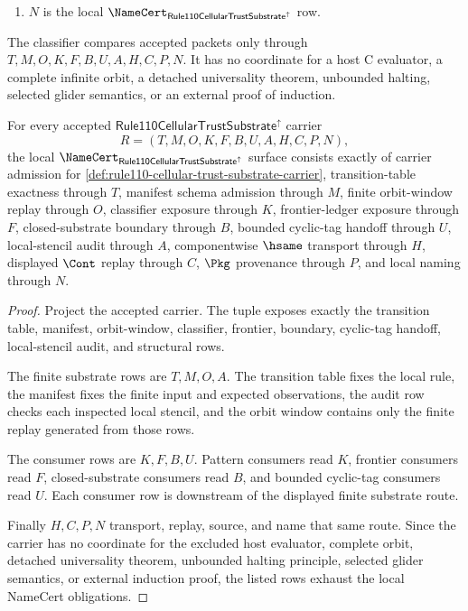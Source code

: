 \begin{definition}
\begin{enumerate}
\item $N$ is the local $\NameCert_{\mathsf{Rule110CellularTrustSubstrate}^{\uparrow}}$ row.
\end{enumerate}
The classifier compares accepted packets only through $T,M,O,K,F,B,U,A,H,C,P,N$. It has no coordinate for a host C evaluator, a complete infinite orbit, a detached universality theorem, unbounded halting, selected glider semantics, or an external proof of induction.
\end{definition}

\begin{theorem}
\label{thm:rule110-cellular-trust-substrate-namecert-obligations}
For every accepted $\mathsf{Rule110CellularTrustSubstrate}^{\uparrow}$ carrier
$$
R=(T,M,O,K,F,B,U,A,H,C,P,N),
$$
the local $\NameCert_{\mathsf{Rule110CellularTrustSubstrate}^{\uparrow}}$ surface consists exactly of carrier admission for \autoref{def:rule110-cellular-trust-substrate-carrier}, transition-table exactness through $T$, manifest schema admission through $M$, finite orbit-window replay through $O$, classifier exposure through $K$, frontier-ledger exposure through $F$, closed-substrate boundary through $B$, bounded cyclic-tag handoff through $U$, local-stencil audit through $A$, componentwise $\hsame$ transport through $H$, displayed $\Cont$ replay through $C$, $\Pkg$ provenance through $P$, and local naming through $N$.
\end{theorem}
\begin{proof}
Project the accepted carrier. The tuple exposes exactly the transition table, manifest, orbit-window, classifier, frontier, boundary, cyclic-tag handoff, local-stencil audit, and structural rows.

The finite substrate rows are $T,M,O,A$. The transition table fixes the local rule, the manifest fixes the finite input and expected observations, the audit row checks each inspected local stencil, and the orbit window contains only the finite replay generated from those rows.

The consumer rows are $K,F,B,U$. Pattern consumers read $K$, frontier consumers read $F$, closed-substrate consumers read $B$, and bounded cyclic-tag consumers read $U$. Each consumer row is downstream of the displayed finite substrate route.

Finally $H,C,P,N$ transport, replay, source, and name that same route. Since the carrier has no coordinate for the excluded host evaluator, complete orbit, detached universality theorem, unbounded halting principle, selected glider semantics, or external induction proof, the listed rows exhaust the local NameCert obligations.
\end{proof}

